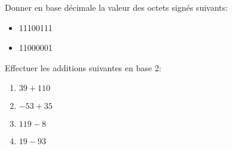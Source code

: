 \documentclass[a4paper,11pt]{article}
\begin{document}
\begin{exo}
    Donner en base décimale la valeur des octets signés suivants:
    \begin{itemize}
        \item 11100111
        \item 11000001
    \end{itemize}
\end{exo}
\begin{exo}
    Effectuer les additions suivantes en base 2:
    \begin{enumerate}
        \item $39+110$
        \item $-53+35$
        \item $119-8$
        \item $19-93$
    \end{enumerate}
\end{exo}
\end{document}
